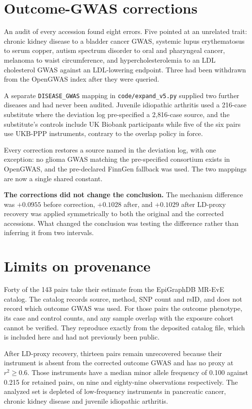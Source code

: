 \documentclass[11pt,a4paper]{article}
\begin{document}
\section{Outcome-GWAS corrections}

An audit of every accession found eight errors. Five pointed at an unrelated trait: chronic
kidney disease to a bladder cancer GWAS, systemic lupus erythematosus to serum copper,
autism spectrum disorder to oral and pharyngeal cancer, melanoma to waist circumference,
and hypercholesterolemia to an LDL cholesterol GWAS against an LDL-lowering endpoint. Three
had been withdrawn from the OpenGWAS index after they were queried.

A separate \texttt{DISEASE\_GWAS} mapping in \texttt{code/expand\_v5.py} supplied two
further diseases and had never been audited. Juvenile idiopathic arthritis used a 216-case
substitute where the deviation log pre-specified a 2{,}816-case source, and the
substitute's controls include UK Biobank participants while five of the six pairs use
UKB-PPP instruments, contrary to the overlap policy in force.

Every correction restores a source named in the deviation log, with one exception: no
glioma GWAS matching the pre-specified consortium exists in OpenGWAS, and the pre-declared
FinnGen fallback was used. The two mappings are now a single shared constant.

\textbf{The corrections did not change the conclusion.} The mechanism difference was
$+0.0955$ before correction, $+0.1028$ after, and $+0.1029$ after LD-proxy recovery was
applied symmetrically to both the original and the corrected accessions. What changed the
conclusion was testing the difference rather than inferring it from two intervals.

\section{Limits on provenance}

Forty of the 143 pairs take their estimate from the EpiGraphDB MR-EvE catalog. The catalog
records source, method, SNP count and rsID, and does not record which outcome GWAS was
used. For those pairs the outcome phenotype, its case and control counts, and any sample
overlap with the exposure cohort cannot be verified. They reproduce exactly from the
deposited catalog file, which is included here and had not previously been public.

After LD-proxy recovery, thirteen pairs remain unrecovered because their instrument is
absent from the corrected outcome GWAS and has no proxy at $r^2 \geq 0.6$. Those
instruments have a median minor allele frequency of 0.100 against 0.215 for retained pairs,
on nine and eighty-nine observations respectively. The analyzed set is depleted of
low-frequency instruments in pancreatic cancer, chronic kidney disease and juvenile
idiopathic arthritis.
\end{document}
